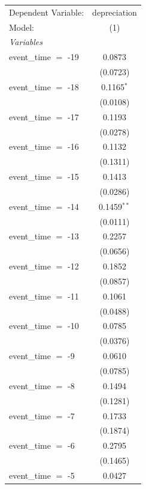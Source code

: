 \begingroup
\centering
\begin{tabular}{lc}
   \tabularnewline \midrule \midrule
   Dependent Variable:  & depreciation\\  
   Model:               & (1)\\  
   \midrule
   \emph{Variables}\\
   event\_time $=$ -19  & 0.0873\\   
                        & (0.0723)\\   
   event\_time $=$ -18  & 0.1165$^{*}$\\   
                        & (0.0108)\\   
   event\_time $=$ -17  & 0.1193\\   
                        & (0.0278)\\   
   event\_time $=$ -16  & 0.1132\\   
                        & (0.1311)\\   
   event\_time $=$ -15  & 0.1413\\   
                        & (0.0286)\\   
   event\_time $=$ -14  & 0.1459$^{**}$\\   
                        & (0.0111)\\   
   event\_time $=$ -13  & 0.2257\\   
                        & (0.0656)\\   
   event\_time $=$ -12  & 0.1852\\   
                        & (0.0857)\\   
   event\_time $=$ -11  & 0.1061\\   
                        & (0.0488)\\   
   event\_time $=$ -10  & 0.0785\\   
                        & (0.0376)\\   
   event\_time $=$ -9   & 0.0610\\   
                        & (0.0785)\\   
   event\_time $=$ -8   & 0.1494\\   
                        & (0.1281)\\   
   event\_time $=$ -7   & 0.1733\\   
                        & (0.1874)\\   
   event\_time $=$ -6   & 0.2795\\   
                        & (0.1465)\\   
   event\_time $=$ -5   & 0.0427\\   

\end{tabular}
